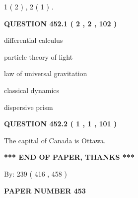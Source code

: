 \documentclass[12pt]{article}
\begin{document}
   
   1 ( 2 )
 ,
   2 ( 1 )
 .
  
\vspace{0.2in}
  
{\textbf{\Large{QUESTION
452.1 
 ( 2 , 2 , 102 )
}}}
  
  
 
 
\noindent{}
 
 
differential calculus
 
 
particle theory of light
 
 
law of universal gravitation
 
 
classical dynamics
 
 
dispersive prism
 
 
 
 
  
\vspace{0.2in}
  
{\textbf{\Large{QUESTION
452.2 
 ( 1 , 1 , 101 )
}}}
  
  
 
 
\noindent{}
 
 
The capital of Canada is Ottawa.
 
 
 
 
   
   
\vspace{1.0in} 
{\textbf{\large{ *** END OF PAPER, THANKS *** }}} 
   
   
\hspace{1.0in} By: 
 239 ( 416 ,  458 )
   
   
   
   
\newpage 
\setcounter{page}{ 
   453001 } 
   
   
   
   
 {\textbf{ \Large{ PAPER NUMBER  453  }}}
   
   
\vspace{0.2in}
   
   
   
   
   
\vspace{0.2in}
   
\end{document}
